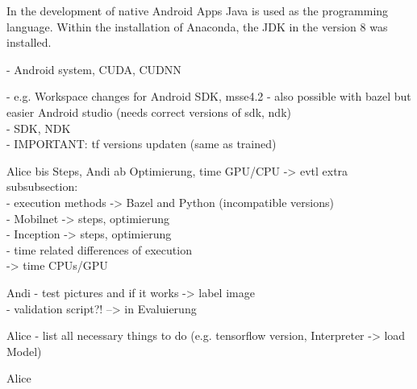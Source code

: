 In the development of native Android Apps Java is used as the programming language. Within the installation of Anaconda, the JDK in the version 8 was installed.

 	- Android system, CUDA, CUDNN
 	
				- e.g. Workspace changes for Android SDK, msse4.2
				- also possible with bazel but easier Android studio (needs correct versions of sdk, ndk) \\
				- SDK, NDK \\
				- IMPORTANT: tf versions updaten (same as trained)

	 Alice bis Steps, Andi ab Optimierung, time GPU/CPU
	-> evtl extra subsubsection: \\
		- execution methods -> Bazel and Python (incompatible versions) \\
		- Mobilnet -> steps, optimierung \\
		- Inception -> steps, optimierung \\
		- time related differences of execution  \\
		  -> time CPUs/GPU

	 Andi
	 	- test pictures and if it works -> label image \\
	 	- validation script?! --> in Evaluierung

	 Alice
		- list all necessary things to do (e.g. tensorflow version, Interpreter -> load Model)

	 Alice
